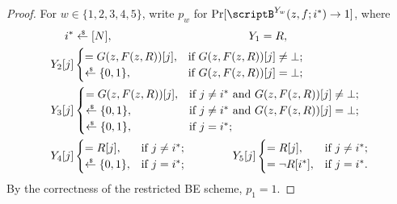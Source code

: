 \begin{proof}
For ${w\in\{1,2,3,4,5\}}$,
write $p_w$ for ${\Pr[\scriptB^{Y_w}(z,f;i^\ast)\to 1]}$, where
\begin{align*}
i^\ast&{}\draws[N],
\qquad\qquad\qquad\qquad\qquad\qquad
Y_1=R,\\
Y_2[j]&\begin{cases}
=G(z,F(z,R))[j],&\textup{if }G(z,F(z,R))[j]\neq\bot;\\
\draws\bit,&\textup{if }G(z,F(z,R))[j]=\bot;
\end{cases}\\
Y_3[j]&\begin{cases}
=G(z,F(z,R))[j],&\textup{if }j\neq i^\ast\textup{ and }G(z,F(z,R))[j]\neq\bot;\\
\draws\bit,&\textup{if }j\neq i^\ast\textup{ and }G(z,F(z,R))[j]=\bot;\\
\draws\bit,&\textup{if }j=i^\ast;
\end{cases}\\
Y_4[j]&\begin{cases}
=R[j],&\textup{if }j\neq i^\ast;\\
\draws\bit,&\textup{if }j=i^\ast;
\end{cases}
\qquad\qquad
Y_5[j]\begin{cases}
=R[j],&\textup{if }j\neq i^\ast;\\
=\neg R[i^\ast],&\textup{if }j=i^\ast.
\end{cases}
\end{align*}
By the correctness of the restricted BE scheme,
${p_1=1}$.


\end{proof}
